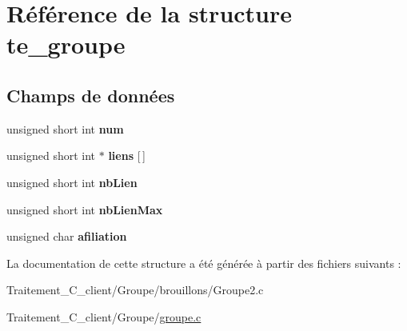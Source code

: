 \hypertarget{structte__groupe}{}\section{Référence de la structure te\+\_\+groupe}
\label{structte__groupe}
\subsection*{Champs de données}
\begin{DoxyCompactItemize}
\item 
unsigned short int {\bfseries num}\hypertarget{structte__groupe_a3ccc5ebed157bcf739817f42bc13807d}{}\label{structte__groupe_a3ccc5ebed157bcf739817f42bc13807d}

\item 
unsigned short int $\ast$ {\bfseries liens} \mbox{[}$\,$\mbox{]}\hypertarget{structte__groupe_adc9b79673d29670871f07a0181bf4a7c}{}\label{structte__groupe_adc9b79673d29670871f07a0181bf4a7c}

\item 
unsigned short int {\bfseries nb\+Lien}\hypertarget{structte__groupe_a012eab139ace11552d9835cfd98c3ddd}{}\label{structte__groupe_a012eab139ace11552d9835cfd98c3ddd}

\item 
unsigned short int {\bfseries nb\+Lien\+Max}\hypertarget{structte__groupe_a411f7b0dd9be935da9a3d882d7b0e087}{}\label{structte__groupe_a411f7b0dd9be935da9a3d882d7b0e087}

\item 
unsigned char {\bfseries afiliation}\hypertarget{structte__groupe_af29b1c1561e330ebaa092075ddf2a613}{}\label{structte__groupe_af29b1c1561e330ebaa092075ddf2a613}

\end{DoxyCompactItemize}


La documentation de cette structure a été générée à partir des fichiers suivants \+:\begin{DoxyCompactItemize}
\item 
Traitement\+\_\+\+C\+\_\+client/\+Groupe/brouillons/Groupe2.\+c\item 
Traitement\+\_\+\+C\+\_\+client/\+Groupe/\hyperlink{groupe_8c}{groupe.\+c}\end{DoxyCompactItemize}
